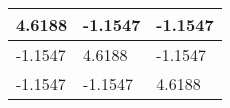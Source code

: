 \begin{tabular}{|l|l|l|}
\hline
4.6188&-1.1547&-1.1547\\\hline
-1.1547&4.6188&-1.1547\\\hline
-1.1547&-1.1547&4.6188\\\hline
\end{tabular}
